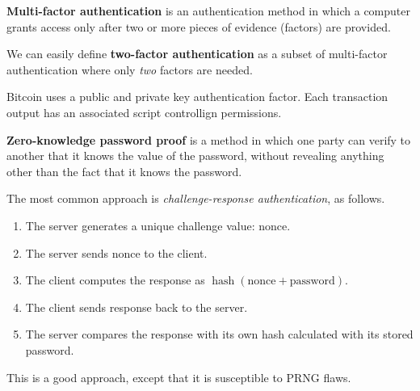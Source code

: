 \begin{definition}
    \textbf{Multi-factor authentication} is an authentication method in which a computer grants access only after two or more pieces of evidence (factors) are provided.
\end{definition}

We can easily define \textbf{two-factor authentication} as a subset of multi-factor authentication where only \emph{two} factors are needed.

\begin{example}[Bitcoin]
    Bitcoin uses a public and private key authentication factor. Each transaction output has an associated script controllign permissions. 
\end{example}

\begin{definition}
    \textbf{Zero-knowledge password proof} is a method in which one party can verify to another that it knows the value of the password, without revealing anything other than the fact that it knows the password.
\end{definition}

\begin{example}
    The most common approach is \emph{challenge-response authentication}, as follows.
    \begin{enumerate}
        \item The server generates a unique challenge value: nonce.
        \item The server sends nonce to the client.
        \item The client computes the response as $\operatorname{hash}(\text{nonce} + \text{password})$.
        \item The client sends response back to the server.
        \item The server compares the response with its own hash calculated with its stored password.
    \end{enumerate}
    This is a good approach, except that it is susceptible to PRNG flaws.
\end{example}

